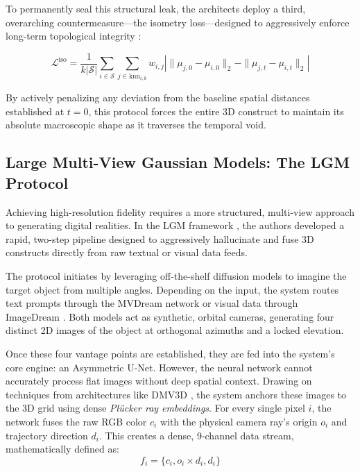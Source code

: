 To permanently seal this structural leak, the architects deploy a third, overarching countermeasure—the isometry loss—designed to aggressively enforce long-term topological integrity \cite{luiten2023dynamic3d}:

\begin{equation}
\mathcal{L}^{\text{iso}} = \frac{1}{k|\mathcal{S}|} \sum_{i \in \mathcal{S}} \sum_{j \in \text{knn}_{i,k}} w_{i,j} \left| \|\mu_{j,0} - \mu_{i,0}\|_2 - \|\mu_{j,t} - \mu_{i,t}\|_2 \right|
\end{equation}

By actively penalizing any deviation from the baseline spatial distances established at $t=0$, this protocol forces the entire 3D construct to maintain its absolute macroscopic shape as it traverses the temporal void.













\subsection{Large Multi-View Gaussian Models: The LGM Protocol}

Achieving high-resolution fidelity requires a more structured, multi-view approach to generating digital realities. In the LGM framework \cite{tang2024lgm}, the authors developed a rapid, two-step pipeline designed to aggressively hallucinate and fuse 3D constructs directly from raw textual or visual data feeds.

The protocol initiates by leveraging off-the-shelf diffusion models to imagine the target object from multiple angles. Depending on the input, the system routes text prompts through the MVDream network \cite{shi2023mvdream} or visual data through ImageDream \cite{wang2023imagedream}. Both models act as synthetic, orbital cameras, generating four distinct 2D images of the object at orthogonal azimuths and a locked elevation. 

Once these four vantage points are established, they are fed into the system's core engine: an Asymmetric U-Net. However, the neural network cannot accurately process flat images without deep spatial context. Drawing on techniques from architectures like DMV3D \cite{xu2023dmv3d}, the system anchors these images to the 3D grid using dense \textit{Plücker ray embeddings}. For every single pixel $i$, the network fuses the raw RGB color $c_i$ with the physical camera ray's origin $o_i$ and trajectory direction $d_i$. This creates a dense, 9-channel data stream, mathematically defined as:
\begin{equation}
f_i = \{c_i, o_i \times d_i, d_i\}
\end{equation}


